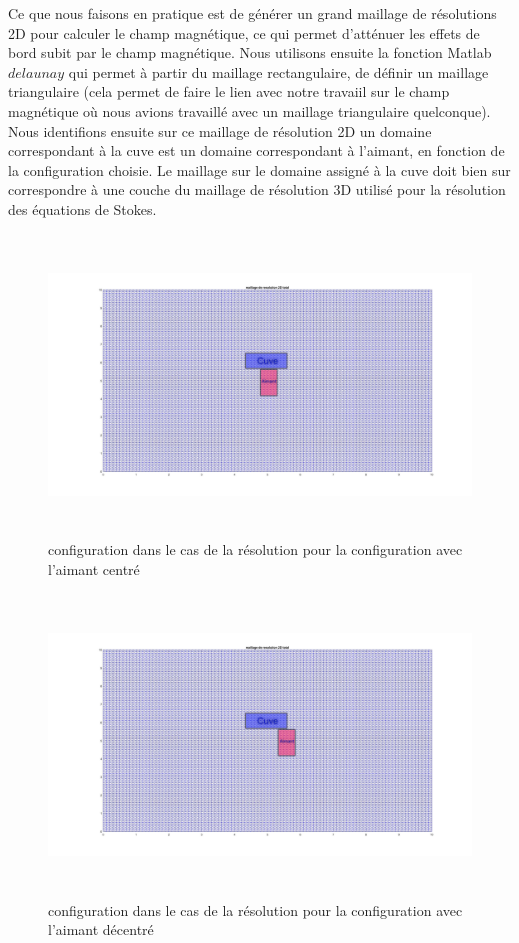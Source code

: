 \documentclass[a4paper,12pt,titlepage]{report}
\begin{document}
\begin{onehalfspace}
Ce que nous faisons en pratique est de générer un grand maillage de résolutions 2D pour calculer le champ magnétique, ce qui permet d'atténuer les effets de bord subit par le champ magnétique. 
\newline
Nous utilisons ensuite la fonction Matlab $delaunay$ qui permet à partir du maillage rectangulaire, de définir un maillage triangulaire (cela permet de faire le lien avec notre travaiil sur le champ magnétique où nous avions travaillé avec un maillage triangulaire quelconque).
Nous identifions ensuite sur ce maillage de résolution 2D un domaine correspondant à la cuve est un domaine correspondant à l'aimant, en fonction de la configuration choisie. Le maillage sur le domaine assigné à la cuve doit bien sur correspondre à une couche du maillage de résolution 3D utilisé pour la résolution des équations de Stokes.

\begin{figure}[!h]
	\includegraphics[height = 8cm, keepaspectratio]{graphes/maillage_resolution_total_centre.jpg}
	\caption{\label{figure 3z } configuration dans le cas de la résolution pour la configuration avec l'aimant centré}
\end{figure}
\begin{figure}[!h]
	\includegraphics[height = 8cm, keepaspectratio]{graphes/maillage_resolution_total_decentre.jpg}
	\caption{\label{figure 3r } configuration dans le cas de la résolution pour la configuration avec l'aimant décentré}
\end{figure}


\end{onehalfspace}
\end{document}
